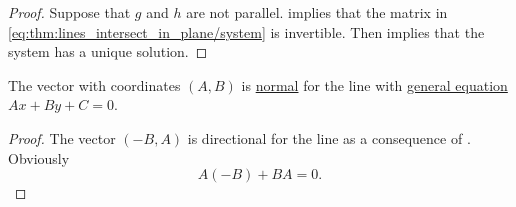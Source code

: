 \begin{proof}
  \UniquenessSubProof Suppose that \( g \) and \( h \) are not parallel.  implies that the matrix in \eqref{eq:thm:lines_intersect_in_plane/system} is invertible. Then  implies that the system has a unique solution.
\end{proof}

\begin{proposition}\label{thm:normal_vector_of_line}
  The vector with coordinates \( (A, B) \) is \hyperref[def:normal_vector]{normal} for the line with \hyperref[def:plane_line_equations/general]{general equation} \( A x + B y + C = 0 \).
\end{proposition}
\begin{proof}
  The vector \( (-B, A) \) is directional for the line as a consequence of . Obviously
  \begin{equation*}
    A(-B) + BA = 0.
  \end{equation*}
\end{proof}

